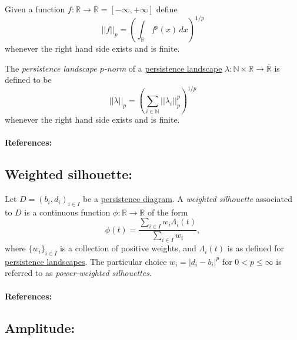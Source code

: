 \documentclass{amsart}
\begin{document}
	Given a function $f : \mathbb R \to \overline{\mathbb R} = [-\infty, +\infty]$ define
	\begin{equation*}
	||f||_p = \left( \int_{\mathbb R} f^p(x)\, dx \right)^{1/p}
	\end{equation*}
	whenever the right hand side exists and is finite.
	
	The \textit{persistence landscape $p$-norm} of a \hyperref[persistence landscape]{persistence landscape} $\lambda : \mathbb N \times \mathbb R \to \overline{\mathbb R}$ is defined to be
	\begin{equation*}
	||\lambda||_p = \left( \sum_{i \in \mathbb N} ||\lambda_i||^p_p \right)^{1/p}
	\end{equation*}
	whenever the right hand side exists and is finite.

	\paragraph{References:} \cite{stein2011functional, bubenik2015statistical}

	\subsection*{Weighted silhouette:} \label{weighted silhouette}

	Let $D = {(b_i, d_i)}_{i \in I}$ be a \hyperref[persistence diagram] {persistence diagram}. A \textit{weighted silhouette} associated to $D$ is a continuous function $\phi : \mathbb R \to \mathbb R$ of the form
	\begin{equation*}
	\phi(t) = \frac{\sum_{i \in I}w_i \Lambda_i(t)}{\sum_{i \in I}w_i},
	\end{equation*}
	where $\{w_i\}_{i \in I}$ is a collection of positive weights, and $\Lambda_i(t)$ is as defined for \hyperref[persistence landscapes]{persistence landscapes}.  The particular choice $w_i = \vert d_i - b_i \vert^p$ for $0 < p \leq \infty$ is referred to as \textit{power-weighted silhouettes}.

	\paragraph{References:}  \cite{chazal2014stochastic}
	
	\subsection*{Amplitude:} \label{amplitude}
\end{document}
